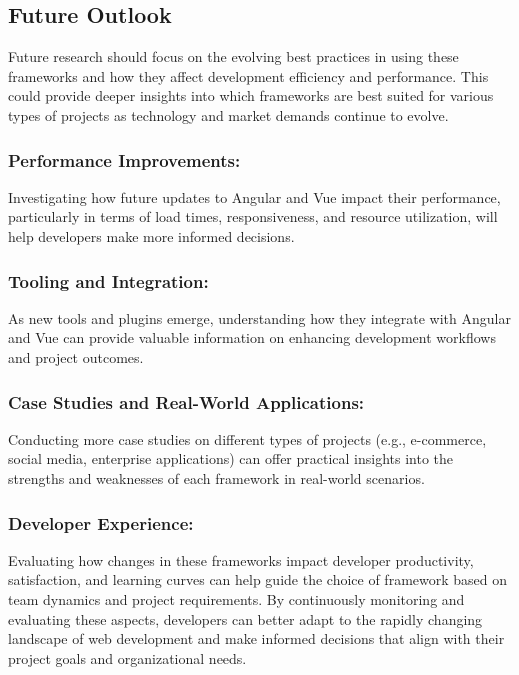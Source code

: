 \documentclass[conference]{IEEEtran}
\begin{document}
\subsection{Future Outlook}
Future research should focus on the evolving best practices in using these frameworks and how they affect development efficiency and performance. This could provide deeper insights into which frameworks are best suited for various types of projects as technology and market demands continue to evolve.
\newline\subsubsection{Performance Improvements:} Investigating how future updates to Angular and Vue impact their performance, particularly in terms of load times, responsiveness, and resource utilization, will help developers make more informed decisions.
\newline\subsubsection{Tooling and Integration:} As new tools and plugins emerge, understanding how they integrate with Angular and Vue can provide valuable information on enhancing development workflows and project outcomes.
\newline\subsubsection{Case Studies and Real-World Applications:} Conducting more case studies on different types of projects (e.g., e-commerce, social media, enterprise applications) can offer practical insights into the strengths and weaknesses of each framework in real-world scenarios.
\newline\subsubsection{Developer Experience:} Evaluating how changes in these frameworks impact developer productivity, satisfaction, and learning curves can help guide the choice of framework based on team dynamics and project requirements.
\newline
By continuously monitoring and evaluating these aspects, developers can better adapt to the rapidly changing landscape of web development and make informed decisions that align with their project goals and organizational needs.
\end{document}
